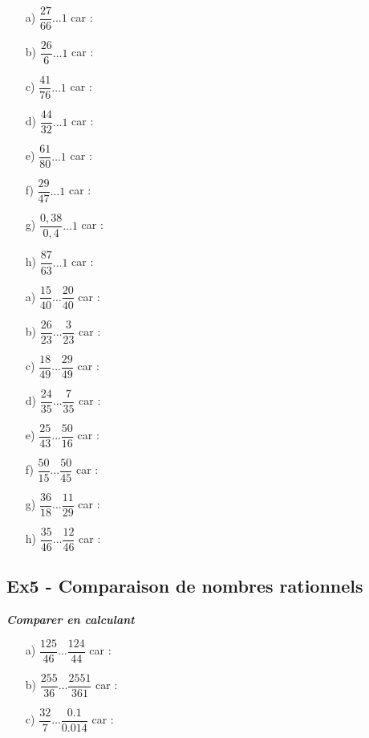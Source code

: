 \documentclass[11pt]{article}
\begin{document}
\begin{multicols}{2}

  \begin{enumerate}
    \item[a)] $ \dfrac{27}{66} \ldots 1 $ car : \dotfill
    \item[b)] $ \dfrac{26}{6}  \ldots 1 $ car : \dotfill
    \item[c)] $ \dfrac{41}{76} \ldots 1 $ car : \dotfill
    \item[d)] $ \dfrac{44}{32} \ldots 1 $ car : \dotfill
    \item[e)] $ \dfrac{61}{80} \ldots 1 $ car : \dotfill
    \item[f)] $ \dfrac{29}{47} \ldots 1 $ car : \dotfill
    \item[g)] $ \dfrac{0,38}{0,4} \ldots 1 $ car : \dotfill
    \item[h)] $ \dfrac{87}{63} \ldots 1 $ car : \dotfill
  \end{enumerate}

\columnbreak

  \begin{enumerate}
    \item[a)] $ \dfrac{15}{40} \ldots \dfrac{20}{40} $  car : \dotfill
    \item[b)] $ \dfrac{26}{23} \ldots \dfrac{3}{23}  $  car : \dotfill
    \item[c)] $ \dfrac{18}{49} \ldots \dfrac{29}{49} $  car : \dotfill
    \item[d)] $ \dfrac{24}{35} \ldots \dfrac{7}{35}  $  car : \dotfill
    \item[e)] $ \dfrac{25}{43} \ldots \dfrac{50}{16} $  car : \dotfill
    \item[f)] $ \dfrac{50}{15} \ldots \dfrac{50}{45} $  car : \dotfill
    \item[g)] $ \dfrac{36}{18} \ldots \dfrac{11}{29} $  car : \dotfill
    \item[h)] $ \dfrac{35}{46} \ldots \dfrac{12}{46} $  car : \dotfill
  \end{enumerate}

\end{multicols}

\subsection*{Ex5 - Comparaison de nombres rationnels}

\textit{\textbf{Comparer en calculant}}

\begin{enumerate}
  \item[a)] $ \dfrac{125}{46} \ldots \dfrac{124}{44} $  car : \dotfill
  \item[b)] $ \dfrac{255}{36} \ldots \dfrac{2551}{361} $  car : \dotfill
  \item[c)] $ \dfrac{32}{7} \ldots \dfrac{0.1}{0.014} $  car : \dotfill
\end{enumerate}
\end{document}
